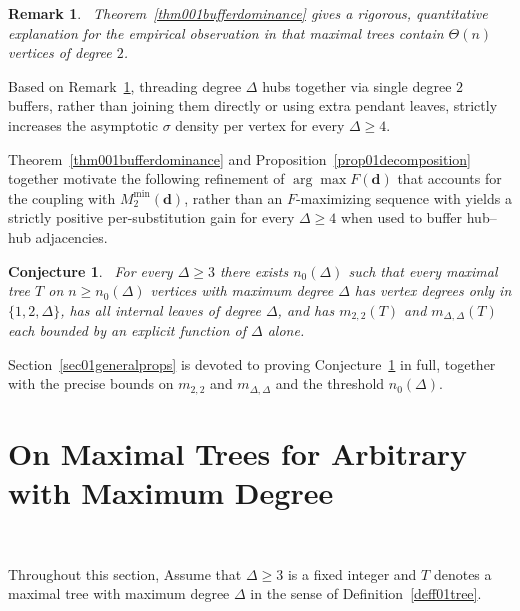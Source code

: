 \documentclass[12pt]{amsart}
\newtheorem{conjecture}[theorem]{Conjecture}
\newtheorem{remark}{Remark}
\begin{document}
\begin{remark}~\label{ermarknum1}
Theorem~\ref{thm001bufferdominance} gives a rigorous, quantitative explanation
for the empirical observation in \cite{DimitrovPaper2025} that maximal trees
contain $\Theta(n)$ vertices of degree $2$.  
\end{remark}
Based on Remark~\ref{ermarknum1}, threading degree $\Delta$ hubs
together via single degree $2$ buffers, rather than joining them directly or
using extra pendant leaves, strictly increases the asymptotic $\sigma$ density
per vertex for every $\Delta\geqslant 4$. 



Theorem~\ref{thm001bufferdominance} and Proposition~\ref{prop01decomposition}
together motivate the following refinement of $\arg\max F(\mathbf d)$ that
accounts for the coupling with $M_2^{\min}(\mathbf d)$, rather than an
$F$-maximizing sequence with yields a strictly
positive per-substitution gain for every $\Delta \ge 4$ when used to buffer
hub–hub adjacencies. 

\begin{conjecture}~\label{conj001guiding}
For every $\Delta\geqslant 3$ there exists $n_0(\Delta)$ such that every maximal tree
$T$ on $n\geqslant n_0(\Delta)$ vertices with maximum degree $\Delta$ has vertex
degrees only in $\{1,2,\Delta\}$, has all internal leaves of degree $\Delta$,
and has $m_{2,2}(T)$ and $m_{\Delta,\Delta}(T)$ each bounded by an explicit
function of $\Delta$ alone.
\end{conjecture}

Section~\ref{sec01generalprops} is devoted to
proving Conjecture~\ref{conj001guiding} in full, together with the precise
bounds on $m_{2,2}$ and $m_{\Delta,\Delta}$ and the threshold $n_0(\Delta)$.
 
\section{On Maximal Trees for Arbitrary  with Maximum Degree}~\label{sec01generalprops}

Throughout this section, Assume that $\Delta\geqslant 3$ is a fixed integer and $T$ denotes a
maximal tree with maximum degree $\Delta$ in the sense of
Definition~\ref{deff01tree}.
\end{document}

